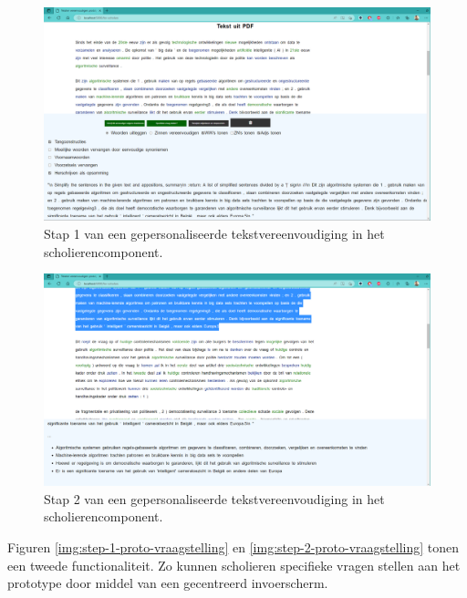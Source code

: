 \begin{center}
	\begin{figure}[H]
		\includegraphics[width=\linewidth]{img/proto-opsomming-1.png}
		\caption{Stap 1 van een gepersonaliseerde tekstvereenvoudiging in het scholierencomponent.}
		\label{img:proto-scholieren-step-1}
	\end{figure}
\end{center}

\begin{center}
	\begin{figure}[H]
		\includegraphics[width=\linewidth]{img/proto-opsomming-3.png}
		\caption{Stap 2 van een gepersonaliseerde tekstvereenvoudiging in het scholierencomponent.}
		\label{img:proto-scholieren-step-3}
	\end{figure}
\end{center}

Figuren \ref{img:step-1-proto-vraagstelling} en \ref{img:step-2-proto-vraagstelling} tonen een tweede functionaliteit. Zo kunnen scholieren specifieke vragen stellen aan het prototype door middel van een gecentreerd invoerscherm.

